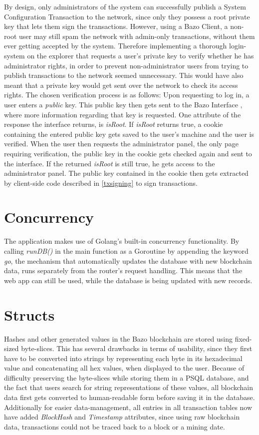 By design, only administrators of the system can successfully publish a System Configuration Transaction to the network, since only they possess a root private key that lets them sign the transactions. However, using a Bazo Client, a non-root user may still spam the network with admin-only transactions, without them ever getting accepted by the system. Therefore implementing a thorough login-system on the explorer that requests a user's private key to verify whether he has administrator rights, in order to prevent non-administrator users from trying to publish transactions to the network seemed unnecessary. This would have also meant that a private key would get sent over the network to check its access rights. The chosen verification process is as follows:
Upon requesting to log in, a user enters a \emph{public} key. This public key then gets sent to the Bazo Interface \cite{marc}, where more information regarding that key is requested. One attribute of the response the interface returns, is \emph{isRoot}. If \emph{isRoot} returns true, a cookie containing the entered public key gets saved to the user's machine and the user is verified. When the user then requests the administrator panel, the only page requiring verification, the public key in the cookie gets checked again and sent to the interface. If the returned \emph{isRoot} is still true, he gets access to the administrator panel. The public key contained in the cookie then gets extracted by client-side code described in \ref{txsigning} to sign transactions.

\section{Concurrency} \label{goroutines}
The application makes use of Golang's built-in concurrency functionality. By calling \emph{runDB()} in the main function as a Goroutine by appending the keyword \emph{go}, the mechanism that automatically updates the database with new blockchain data, runs separately from the router's request handling. This means that the web app can still be used, while the database is being updated with new records.

\section{Structs}
Hashes and other generated values in the Bazo blockchain are stored using fixed-sized byte-slices. This has several drawbacks in terms of usability, since they first have to be converted into strings by representing each byte in its hexadecimal value and concatenating all hex values, when displayed to the user. Because of difficulty preserving the byte-slices while storing them in a PSQL database, and the fact that users search for string representations of these values, all blockchain data first gets converted to human-readable form before saving it in the database. Additionally for easier data-management, all entries in all transaction tables now have added \emph{BlockHash} and \emph{Timestamp} attributes, since using raw blockchain data, transactions could not be traced back to a block or a mining date.

